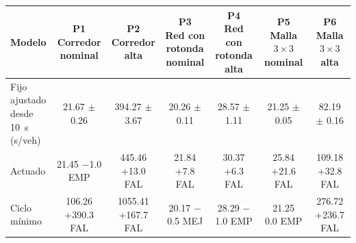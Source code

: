 \begin{table}[!tbp]
\centering
\scriptsize
\setlength{\tabcolsep}{2.5pt}
\begin{tabular}{lcccccc}
\toprule
Modelo & \makecell{P1\\Corredor\\nominal} & \makecell{P2\\Corredor\\alta} & \makecell{P3\\Red con\\rotonda\\nominal} & \makecell{P4\\Red con\\rotonda\\alta} & \makecell{P5\\Malla $3 \times 3$\\nominal} & \makecell{P6\\Malla $3 \times 3$\\alta} \\
\midrule
\makecell[l]{Fijo ajustado\\desde 10~s\\(s/veh)} & \makecell{21.67\\$\pm$ 0.26} & \makecell{394.27\\$\pm$ 3.67} & \makecell{20.26\\$\pm$ 0.11} & \makecell{28.57\\$\pm$ 1.11} & \makecell{21.25\\$\pm$ 0.05} & \makecell{82.19\\$\pm$ 0.16} \\
\midrule
Actuado & \makecell{21.45\\$-$1.0 EMP} & \makecell{445.46\\+13.0 FAL} & \makecell{21.84\\+7.8 FAL} & \makecell{30.37\\+6.3 FAL} & \makecell{25.84\\+21.6 FAL} & \makecell{109.18\\+32.8 FAL} \\
Ciclo mínimo & \makecell{106.26\\+390.3 FAL} & \makecell{1055.41\\+167.7 FAL} & \makecell{20.17\\$-$0.5 MEJ} & \makecell{28.29\\$-$1.0 EMP} & \makecell{21.25\\0.0 EMP} & \makecell{276.72\\+236.7 FAL} \\

\end{tabular}
\end{table}

